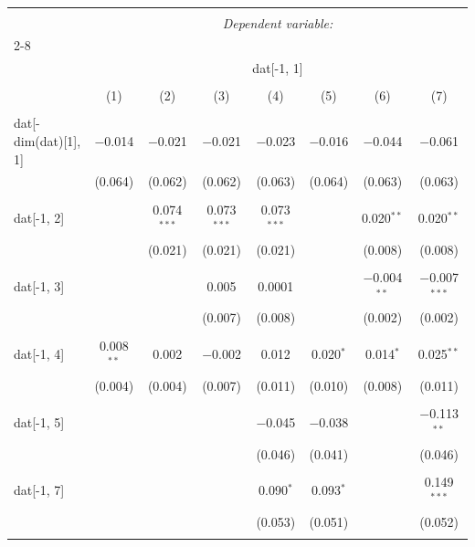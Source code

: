 
\begin{table}[!htbp] \centering 
  \caption{} 
  \label{} 
\begin{tabular}{@{\extracolsep{5pt}}lccccccc} 
\\[-1.8ex]\hline 
\hline \\[-1.8ex] 
 & \multicolumn{7}{c}{\textit{Dependent variable:}} \\ 
\cline{2-8} 
\\[-1.8ex] & \multicolumn{7}{c}{dat[-1, 1]} \\ 
\\[-1.8ex] & (1) & (2) & (3) & (4) & (5) & (6) & (7)\\ 
\hline \\[-1.8ex] 
 dat[-dim(dat)[1], 1] & $-$0.014 & $-$0.021 & $-$0.021 & $-$0.023 & $-$0.016 & $-$0.044 & $-$0.061 \\ 
  & (0.064) & (0.062) & (0.062) & (0.063) & (0.064) & (0.063) & (0.063) \\ 
  & & & & & & & \\ 
 dat[-1, 2] &  & 0.074$^{***}$ & 0.073$^{***}$ & 0.073$^{***}$ &  & 0.020$^{**}$ & 0.020$^{**}$ \\ 
  &  & (0.021) & (0.021) & (0.021) &  & (0.008) & (0.008) \\ 
  & & & & & & & \\ 
 dat[-1, 3] &  &  & 0.005 & 0.0001 &  & $-$0.004$^{**}$ & $-$0.007$^{***}$ \\ 
  &  &  & (0.007) & (0.008) &  & (0.002) & (0.002) \\ 
  & & & & & & & \\ 
 dat[-1, 4] & 0.008$^{**}$ & 0.002 & $-$0.002 & 0.012 & 0.020$^{*}$ & 0.014$^{*}$ & 0.025$^{**}$ \\ 
  & (0.004) & (0.004) & (0.007) & (0.011) & (0.010) & (0.008) & (0.011) \\ 
  & & & & & & & \\ 
 dat[-1, 5] &  &  &  & $-$0.045 & $-$0.038 &  & $-$0.113$^{**}$ \\ 
  &  &  &  & (0.046) & (0.041) &  & (0.046) \\ 
  & & & & & & & \\ 
 dat[-1, 7] &  &  &  & 0.090$^{*}$ & 0.093$^{*}$ &  & 0.149$^{***}$ \\ 
  &  &  &  & (0.053) & (0.051) &  & (0.052) \\ 
  & & & & & & & \\ 

\end{tabular}
\end{table}
